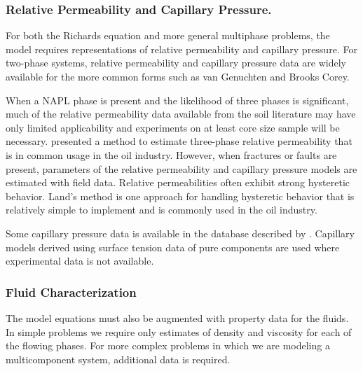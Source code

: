 \subsubsection{Relative Permeability and Capillary Pressure.}

For both the Richards equation and more general multiphase problems, the
model requires representations of relative permeability and capillary
pressure.  For two-phase systems, relative permeability and capillary
pressure data are widely available for the more common forms such as
van Genuchten and Brooks Corey.

When a NAPL phase is present and the likelihood of three phases is
significant, much of the relative permeability data available from the
soil literature may have only limited applicability and experiments on
at least core size sample will be necessary.
\citet{stone1973estimation} presented a method to estimate three-phase
relative permeability that is in common usage in the oil
industry. However, when fractures or faults are present, parameters of
the relative permeability and capillary pressure models are estimated
with field data.  Relative permeabilities often exhibit strong
hysteretic behavior.  Land's method
\citep{land1968calculation,spiteri2006impact} is one approach for
handling hysteretic behavior that is relatively simple to implement
and is commonly used in the oil industry.

 Some capillary pressure data is available in the database described
by \citet{schaap2001computer}. Capillary models derived using surface
tension data of pure components \citep{prausnitz1977properties} are
used where experimental data is not available.

\subsubsection{Fluid Characterization}

The model equations must also be augmented with property data for the
fluids.  In simple problems we require only estimates of density and
viscosity for each of the flowing phases.  For more complex problems
in which we are modeling a multicomponent system, additional data is
required.




